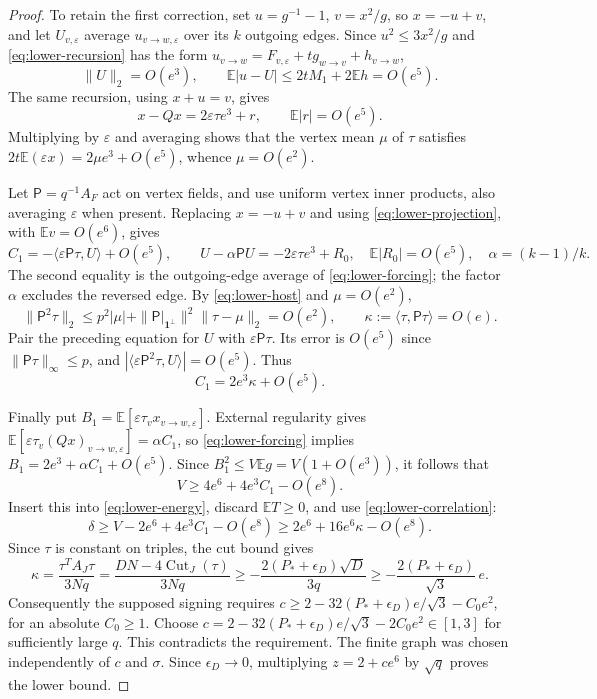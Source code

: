 \documentclass[10pt]{article}
\numberwithin{equation}{section}
\newcommand{\1}{\mathbf1}
\begin{document}
\begin{proof}
To retain the first correction, set $u=g^{-1}-1$, $v=x^2/g$, so
$x=-u+v$, and let $U_{v,\varepsilon}$ average $u_{v\to w,\varepsilon}$
over its $k$ outgoing edges. Since $u^2\le3x^2/g$ and
\eqref{eq:lower-recursion} has the form
$u_{v\to w}=F_{v,\varepsilon}+tg_{w\to v}+h_{v\to w}$,
\begin{equation}\label{eq:lower-projection}
 \|U\|_2=O(e^3),\qquad
 \mathbb E|u-U|\le2tM_1+2\mathbb Eh=O(e^5).
\end{equation}
The same recursion, using $x+u=v$, gives
\begin{equation}\label{eq:lower-forcing}
 x-Qx=2\varepsilon\tau e^3+r,\qquad\mathbb E|r|=O(e^5).
\end{equation}
Multiplying by $\varepsilon$ and averaging shows that the vertex mean
$\mu$ of $\tau$ satisfies
$2t\mathbb E(\varepsilon x)=2\mu e^3+O(e^5)$, whence $\mu=O(e^2)$.

Let $\mathsf P=q^{-1}A_F$ act on vertex fields, and use uniform vertex
inner products, also averaging $\varepsilon$ when present. Replacing
$x=-u+v$ and using \eqref{eq:lower-projection}, with
$\mathbb Ev=O(e^6)$, gives
\[
 C_1=-\langle\varepsilon\mathsf P\tau,U\rangle+O(e^5),\qquad
 U-\alpha\mathsf P U=-2\varepsilon\tau e^3+R_0,
 \quad \mathbb E|R_0|=O(e^5),\quad \alpha=(k-1)/k.
\]
The second equality is the outgoing-edge average of
\eqref{eq:lower-forcing}; the factor $\alpha$ excludes the reversed edge.
By \eqref{eq:lower-host} and $\mu=O(e^2)$,
\[
 \|\mathsf P^2\tau\|_2
 \le p^2|\mu|+\|\mathsf P|_{\mathbf1^\perp}\|^2\|\tau-\mu\|_2
 =O(e^2),\qquad \kappa:=\langle\tau,\mathsf P\tau\rangle=O(e).
\]
Pair the preceding equation for $U$ with $\varepsilon\mathsf P\tau$.
Its error is $O(e^5)$ since $\|\mathsf P\tau\|_\infty\le p$, and
$|\langle\varepsilon\mathsf P^2\tau,U\rangle|=O(e^5)$. Thus
\begin{equation}\label{eq:lower-correlation}
                         C_1=2e^3\kappa+O(e^5).
\end{equation}

Finally put $B_1=\mathbb E[\varepsilon\tau_vx_{v\to w,\varepsilon}]$.
External regularity gives
$\mathbb E[\varepsilon\tau_v(Qx)_{v\to w,\varepsilon}]=\alpha C_1$,
so \eqref{eq:lower-forcing} implies
$B_1=2e^3+\alpha C_1+O(e^5)$.
Since $B_1^2\le V\mathbb Eg=V(1+O(e^3))$, it follows that
\[
 V\ge4e^6+4e^3C_1-O(e^8).
\]
Insert this into \eqref{eq:lower-energy}, discard $\mathbb ET\ge0$,
and use \eqref{eq:lower-correlation}:
\[
 \delta\ge V-2e^6+4e^3C_1-O(e^8)
          \ge2e^6+16e^6\kappa-O(e^8).
\]
Since $\tau$ is constant on triples, the cut bound gives
\[
 \kappa=\frac{\tau^TA_J\tau}{3Nq}
 =\frac{DN-4\operatorname{Cut}_J(\tau)}{3Nq}
 \ge-\frac{2(P_*+\epsilon_D)\sqrt D}{3q}
 \ge-\frac{2(P_*+\epsilon_D)}{\sqrt3}\,e.
\]
Consequently the supposed signing requires
$c\ge2-32(P_*+\epsilon_D)e/\sqrt3-C_0e^2$, for an absolute
$C_0\ge1$. Choose
$c=2-32(P_*+\epsilon_D)e/\sqrt3-2C_0e^2\in[1,3]$ for sufficiently
large $q$. This contradicts the requirement. The finite graph was
chosen independently of $c$ and $\sigma$. Since $\epsilon_D\to0$,
multiplying $z=2+ce^6$ by $\sqrt q$ proves the lower bound.
\end{proof}
\end{document}
